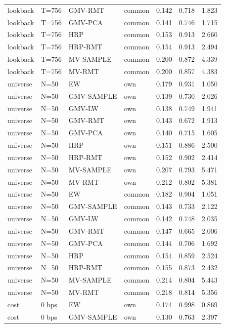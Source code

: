 \begin{table}[t]
{\begin{tabular}{llllrrr}
lookback & T=756 & GMV-RMT & common & 0.142 & 0.718 & 1.823 \\
lookback & T=756 & GMV-PCA & common & 0.141 & 0.746 & 1.715 \\
lookback & T=756 & HRP & common & 0.153 & 0.913 & 2.660 \\
lookback & T=756 & HRP-RMT & common & 0.154 & 0.913 & 2.494 \\
lookback & T=756 & MV-SAMPLE & common & 0.200 & 0.872 & 4.339 \\
lookback & T=756 & MV-RMT & common & 0.200 & 0.857 & 4.383 \\
universe & N=50 & EW & own & 0.179 & 0.931 & 1.050 \\
universe & N=50 & GMV-SAMPLE & own & 0.139 & 0.730 & 2.026 \\
universe & N=50 & GMV-LW & own & 0.138 & 0.749 & 1.941 \\
universe & N=50 & GMV-RMT & own & 0.143 & 0.672 & 1.913 \\
universe & N=50 & GMV-PCA & own & 0.140 & 0.715 & 1.605 \\
universe & N=50 & HRP & own & 0.151 & 0.886 & 2.500 \\
universe & N=50 & HRP-RMT & own & 0.152 & 0.902 & 2.414 \\
universe & N=50 & MV-SAMPLE & own & 0.207 & 0.793 & 5.471 \\
universe & N=50 & MV-RMT & own & 0.212 & 0.802 & 5.381 \\
universe & N=50 & EW & common & 0.182 & 0.904 & 1.051 \\
universe & N=50 & GMV-SAMPLE & common & 0.143 & 0.733 & 2.122 \\
universe & N=50 & GMV-LW & common & 0.142 & 0.748 & 2.035 \\
universe & N=50 & GMV-RMT & common & 0.147 & 0.665 & 2.006 \\
universe & N=50 & GMV-PCA & common & 0.144 & 0.706 & 1.692 \\
universe & N=50 & HRP & common & 0.154 & 0.859 & 2.524 \\
universe & N=50 & HRP-RMT & common & 0.155 & 0.873 & 2.432 \\
universe & N=50 & MV-SAMPLE & common & 0.214 & 0.804 & 5.443 \\
universe & N=50 & MV-RMT & common & 0.218 & 0.814 & 5.356 \\
cost & 0 bps & EW & own & 0.174 & 0.998 & 0.869 \\
cost & 0 bps & GMV-SAMPLE & own & 0.130 & 0.763 & 2.397 \\

\end{tabular}}
\end{table}
